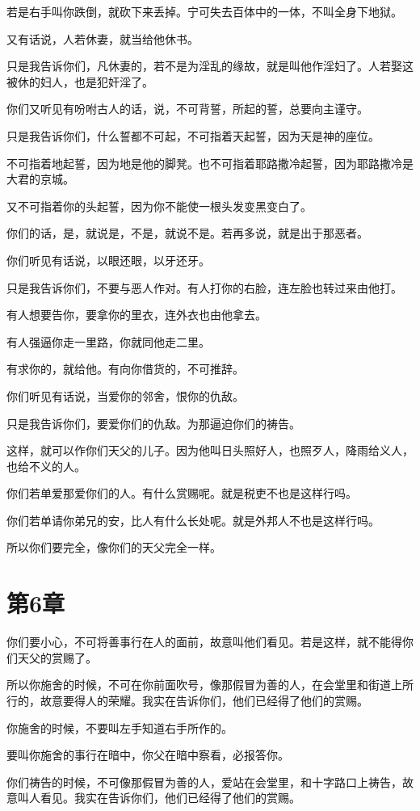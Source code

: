 \documentclass[12pt,oneside]{book}
\begin{document}
若是右手叫你跌倒，就砍下来丢掉。宁可失去百体中的一体，不叫全身下地狱。

又有话说，人若休妻，就当给他休书。

只是我告诉你们，凡休妻的，若不是为淫乱的缘故，就是叫他作淫妇了。人若娶这被休的妇人，也是犯奸淫了。

你们又听见有吩咐古人的话，说，不可背誓，所起的誓，总要向主谨守。

只是我告诉你们，什么誓都不可起，不可指着天起誓，因为天是神的座位。

不可指着地起誓，因为地是他的脚凳。也不可指着耶路撒冷起誓，因为耶路撒冷是大君的京城。

又不可指着你的头起誓，因为你不能使一根头发变黑变白了。

你们的话，是，就说是，不是，就说不是。若再多说，就是出于那恶者。

你们听见有话说，以眼还眼，以牙还牙。

只是我告诉你们，不要与恶人作对。有人打你的右脸，连左脸也转过来由他打。

有人想要告你，要拿你的里衣，连外衣也由他拿去。

有人强逼你走一里路，你就同他走二里。

有求你的，就给他。有向你借货的，不可推辞。

你们听见有话说，当爱你的邻舍，恨你的仇敌。

只是我告诉你们，要爱你们的仇敌。为那逼迫你们的祷告。

这样，就可以作你们天父的儿子。因为他叫日头照好人，也照歹人，降雨给义人，也给不义的人。

你们若单爱那爱你们的人。有什么赏赐呢。就是税吏不也是这样行吗。

你们若单请你弟兄的安，比人有什么长处呢。就是外邦人不也是这样行吗。

所以你们要完全，像你们的天父完全一样。

\chapter{第6章}
你们要小心，不可将善事行在人的面前，故意叫他们看见。若是这样，就不能得你们天父的赏赐了。

所以你施舍的时候，不可在你前面吹号，像那假冒为善的人，在会堂里和街道上所行的，故意要得人的荣耀。我实在告诉你们，他们已经得了他们的赏赐。

你施舍的时候，不要叫左手知道右手所作的。

要叫你施舍的事行在暗中，你父在暗中察看，必报答你。

你们祷告的时候，不可像那假冒为善的人，爱站在会堂里，和十字路口上祷告，故意叫人看见。我实在告诉你们，他们已经得了他们的赏赐。
\end{document}
